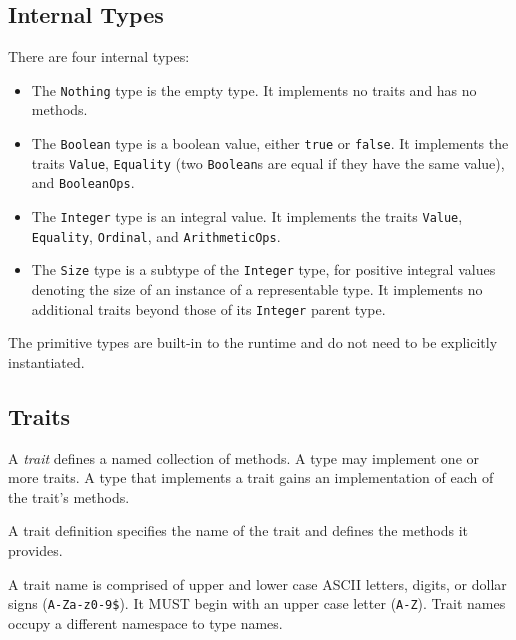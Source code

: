 \documentclass[10pt,twocolumn,a4paper]{article}
\newcommand{\code}[1]{\texttt{#1}}
\begin{document}
\subsection{Internal Types}

There are four internal types: 
\begin{itemize}
  \item The \code{Nothing} type is the empty type. 
    It implements no traits and has no methods.

  \item The \code{Boolean} type is a boolean value, either \code{true} or
    \code{false}.  It implements the traits \code{Value}, \code{Equality}
    (two \code{Boolean}s are equal if they have the same value), and
    \code{BooleanOps}.

  \item The \code{Integer} type is an integral value. It implements the
    traits \code{Value}, \code{Equality}, \code{Ordinal}, and
    \code{ArithmeticOps}.

  \item The \code{Size} type is a subtype of the \code{Integer} type, for
    positive integral values denoting the size of an instance of a
    representable type. It implements no additional traits beyond those
    of its \code{Integer} parent type.
\end{itemize}

The primitive types are built-in to the runtime and do not need to be
explicitly instantiated.

\subsection{Traits}
\label{sec:traits}

A \emph{trait} defines a named collection of methods. A type may implement
one or more traits. A type that implements a trait gains an implementation
of each of the trait's methods.

A trait definition specifies the name of the trait and defines the methods
it provides.

A trait name is comprised of upper and lower case ASCII letters, digits, or
dollar signs (\code{A-Za-z0-9\$}).  It MUST begin with an upper case letter
(\code{A-Z}). Trait names occupy a different namespace to type names.
\end{document}
